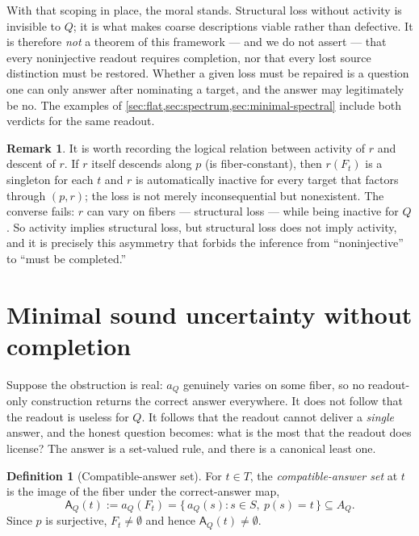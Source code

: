 \documentclass[11pt,reqno]{amsart}
\theoremstyle{plain}
\theoremstyle{definition}
\newtheorem{definition}[theorem]{Definition}
\newtheorem{remark}[theorem]{Remark}
\newcommand{\Src}{S}
\newcommand{\Rdt}{T}
\newcommand{\CompatSet}{\mathsf{A}}      %
\begin{document}
With that scoping in place, the moral stands. Structural loss without activity is invisible to
$Q$; it is what makes coarse descriptions viable rather than defective. It is therefore \emph{not}
a theorem of this framework --- and we do not assert --- that every noninjective readout requires
completion, nor that every lost source distinction must be restored. Whether a given loss must be
repaired is a question one can only answer after nominating a target, and the answer may
legitimately be no. The examples of \cref{sec:flat,sec:spectrum,sec:minimal-spectral} include both
verdicts for the same readout.

\begin{remark}\label{rem:activity-vs-descent}
It is worth recording the logical relation between activity of $r$ and descent of $r$. If $r$
itself descends along $p$ (is fiber-constant), then $r(F_t)$ is a singleton for each $t$ and $r$
is automatically inactive for every target that factors through $(p,r)$; the loss is not merely
inconsequential but nonexistent. The converse fails: $r$ can vary on fibers --- structural loss
--- while being inactive for $Q$. So activity implies structural loss, but structural loss does
not imply activity, and it is precisely this asymmetry that forbids the inference from
``noninjective'' to ``must be completed.''
\end{remark}

\section{Minimal sound uncertainty without completion}\label{sec:uncertainty}

Suppose the obstruction is real: $a_Q$ genuinely varies on some fiber, so no readout-only
construction returns the correct answer everywhere. It does not follow that the readout is
useless for $Q$. It follows that the readout cannot deliver a \emph{single} answer, and the
honest question becomes: what is the most that the readout does license? The answer is a
set-valued rule, and there is a canonical least one.

\begin{definition}[Compatible-answer set]\label{def:compat}
For $t\in\Rdt$, the \emph{compatible-answer set} at $t$ is the image of the fiber under the
correct-answer map,
\begin{equation}\label{eq:compat}
\CompatSet_Q(t):=a_Q(F_t)=\{\, a_Q(s) : s\in\Src,\ p(s)=t \,\}\subseteq A_Q .
\end{equation}
Since $p$ is surjective, $F_t\neq\emptyset$ and hence $\CompatSet_Q(t)\neq\emptyset$.
\end{definition}
\end{document}
